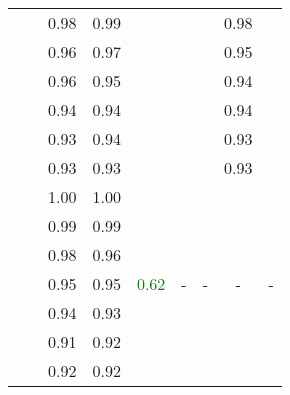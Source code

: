 \begin{table}
\begin{tabular}{ccccccccc}
		& & 0.98 & 0.99 & & & & 0.98 & \\
		& & 0.96 & 0.97 & & & & 0.95 & \\
		& & 0.96 & 0.95 & & & & 0.94 & \\
		& & 0.94 & 0.94 & & & & 0.94 & \\
		& & 0.93 & 0.94 & & & & 0.93 & \\
		& & 0.93 & 0.93 & & & & 0.93 & \\
		\cline{2-9}
		& \multirow{7}{*}{\rotatebox[origin=c]{90}{\ac{fcgm} - interface}}& 1.00 & 1.00 & \multirow{7}{*}{\textcolor{green}{0.62}} & \multirow{7}{*}{-} & \multirow{7}{*}{-} & \multirow{7}{*}{-} & \multirow{7}{*}{-} \\
		& & 0.99 & 0.99 & & & & &\\
		& & 0.98 & 0.96 & & & & &\\
		& & 0.95 & 0.95 & & & & &\\
		& & 0.94 & 0.93 & & & & &\\
		& & 0.91 & 0.92 & & & & &\\
		& & 0.92 & 0.92 & & & & &\\
		\bottomrule
	\end{tabular}
\end{table}

